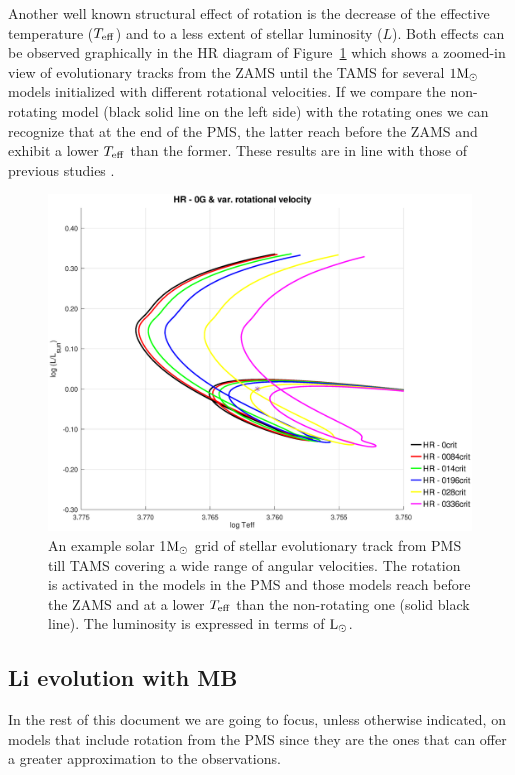 \documentclass[fleqn,usenatbib]{mnras}
\begin{document}
{{Another well known structural effect of rotation is the decrease of the effective temperature ($T_{\mathrm{eff}}$) and to a less extent of stellar luminosity ($L$). Both effects can be observed graphically in the HR diagram of Figure~\ref{fig:hr_var_vel_0g} which shows a zoomed-in view of evolutionary tracks from the ZAMS until the TAMS for several $1\mathrm{M}_\odot$ models initialized with different rotational velocities. If we compare the non-rotating model (black solid line on the left side) with the rotating ones we can recognize that at the end of the PMS, the latter reach before the ZAMS and exhibit a lower $T_{\mathrm{eff}}$ than the former. These results are in line with those of previous studies \citep[see e.g. ][]{Eggenberger2012,Piau2001,Pinsonneault1989}.\par


\begin{figure}
	\includegraphics[trim = 30mm 15mm 20mm 15mm, clip,width=\columnwidth]{figures/hr_var_vel_0_0g_z1.eps}
    \caption{An example solar 1$\mathrm{M}_\odot$ grid of stellar evolutionary track from PMS till TAMS covering a wide range of angular velocities. The rotation is activated in the models in the PMS and those models reach before the ZAMS and at a lower $T_{\mathrm{eff}}$ than the non-rotating one (solid black line). The luminosity is expressed in terms of $\mathrm{L}_\odot$.}
    \label{fig:hr_var_vel_0g}
\end{figure}

\subsection{Li evolution with MB}
In the rest of this document we are going to focus, unless otherwise indicated, on models that include rotation from the PMS since they are the ones that can offer a greater approximation to the observations.\par

}}
\end{document}
